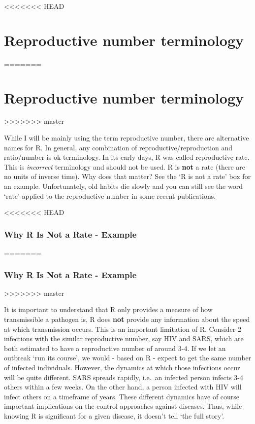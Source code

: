 \documentclass[]{book}
\theoremstyle{definition}
\theoremstyle{definition}
\theoremstyle{definition}
\theoremstyle{remark}
\begin{document}
<<<<<<< HEAD
\hypertarget{reproductive-number-terminology}{%
\section{Reproductive number
terminology}\label{reproductive-number-terminology}}
=======
\section{Reproductive number
terminology}\label{reproductive-number-terminology}
>>>>>>> master

While I will be mainly using the term reproductive number, there are
alternative names for R. In general, any combination of
reproductive/reproduction and ratio/number is ok terminology. In its
early days, R was called reproductive rate. This is \emph{incorrect}
terminology and should not be used. R is \textbf{not} a rate (there are
no units of inverse time). Why does that matter? See the `R is not a
rate' box for an example. Unfortunately, old habits die slowly and you
can still see the word `rate' applied to the reproductive number in some
recent publications.

<<<<<<< HEAD
\hypertarget{myexamplebox}{%
\subsubsection{Why R Is Not a Rate - Example}\label{myexamplebox}}
=======
\subsubsection{Why R Is Not a Rate - Example}\label{myexamplebox}
>>>>>>> master

It is important to understand that R only provides a measure of how
transmissible a pathogen is, R does \textbf{not} provide any information
about the speed at which transmission occurs. This is an important
limitation of R. Consider 2 infections with the similar reproductive
number, say HIV and SARS, which are both estimated to have a
reproductive number of around 3-4. If we let an outbreak `run its
course', we would - based on R - expect to get the same number of
infected individuals. However, the dynamics at which those infections
occur will be quite different. SARS spreads rapidly, i.e.~an infected
person infects 3-4 others within a few weeks. On the other hand, a
person infected with HIV will infect others on a timeframe of years.
These different dynamics have of course important implications on the
control approaches against diseases. Thus, while knowing R is
significant for a given disease, it doesn't tell `the full story'.
\end{document}
